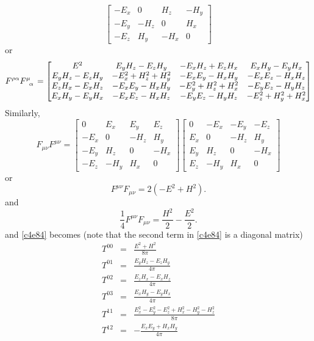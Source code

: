 \begin{enumerate}
\[\begin{bmatrix}
 -E_x & 0 & H_z & -H_y \\
 -E_y & -H_z & 0 & H_x \\
 -E_z & H_y & -H_x & 0 
 \end{bmatrix}
\]
or
\begin{equation}\label{c4e86}
F^{\rho\alpha}\tensor{F}{^\mu_\alpha} =
\begin{bmatrix} 
E^2 & E_yH_z - E_zH_y & -E_xH_z + E_zH_x & E_xH_y  - E_yH_x \\
E_yH_z - E_zH_y & -E_x^2 + H_z^2 + H_y^2 & -E_xE_y -H_xH_y & -E_xE_z -H_xH_z \\
E_zH_x-E_xH_z & -E_xE_y - H_xH_y & -E_y^2 + H_z^2 + H_x^2 & -E_yE_z - H_yH_z \\
E_xH_y - E_yH_x & -E_xE_z -H_xH_z & -E_yE_z - H_yH_z & -E_z^2 + H_y^2 + H_x^2
\end{bmatrix}
\end{equation}
Similarly,
\[
F_{\mu\nu}F^{\mu\nu} = \begin{bmatrix} 0 & E_x & E_y & E_z \\
-E_x & 0 & -H_z & H_y \\
-E_y & H_z & 0 & -H_x \\
-E_z & -H_y & H_x & 0
\end{bmatrix}\begin{bmatrix} 0 & -E_x & -E_y & -E_z \\
E_x & 0 & -H_z & H_y \\
E_y & H_z & 0 & -H_x \\
E_z & -H_y & H_x & 0
\end{bmatrix}
\]
or
\begin{equation}\label{c4e87}
F^{\mu\nu}F_{\mu\nu} = 2(-E^2 + H^2).
\end{equation}
and
\begin{equation}\label{c4e88}
\frac{1}{4}F^{\mu\nu}F_{\mu\nu} = \frac{H^2}{2} - \frac{E^2}{2}.
\end{equation}
and \eqref{c4e84} becomes (note that the second term in \eqref{c4e84} is a 
diagonal matrix)
\begin{eqnarray*}
T^{00} &=& \frac{E^2 + H^2}{8\pi} \\
T^{01} &=& \frac{E_yH_z - E_zH_y}{4\pi} \\
T^{02} &=& \frac{E_zH_x - E_xH_z}{4\pi} \\
T^{03} &=& \frac{E_xH_y - E_yH_x}{4\pi} \\
T^{11} &=& \frac{E_x^2 - E_y^2 - E_z^2 + H_x^2 - H_y^2 - H_z^2}{8\pi} \\
T^{12} &=& -\frac{E_xE_y + H_xH_y}{4\pi} \\

\end{eqnarray*}
\end{enumerate}
